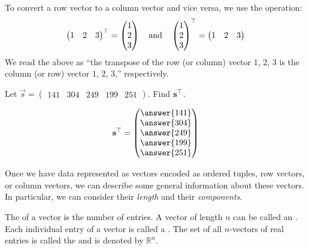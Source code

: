 \documentclass{ximera}
\begin{document}
\begin{definition}
  To convert a row vector to a column vector and vice versa, we use
  the  operation:
  \[
  \begin{pmatrix} 1 &  2 & 3 \end{pmatrix}^\top =
  \begin{pmatrix} 1 \\ 2 \\ 3 \end{pmatrix}
  \quad\text{and}\quad
  \begin{pmatrix} 1 \\ 2 \\ 3 \end{pmatrix}^\top =
  \begin{pmatrix} 1 &  2 & 3 \end{pmatrix}
  \]
  We read the above as ``the transpose of the row (or column) vector $1$,
  $2$, $3$ is the column (or row) vector $1$, $2$, $3$,'' respectively.
\end{definition}


\begin{question}
  Let
  $\vec{s} = \begin{pmatrix}141 & 304 & 249 & 199 &
    251 \end{pmatrix}$. Find $\mathbf{s}^\top$.
  \begin{prompt}
  \[
  \vec{s}^\transpose  = \begin{pmatrix}\answer{141} \\ \answer{304} \\ \answer{249} \\ \answer{199} \\ \answer{251} \end{pmatrix}
  \]
  \end{prompt}
\end{question}

Once we have data represented as vectors encoded as ordered tuples,
row vectors, or column vectors, we can describe some general
information about these vectors. In particular, we can consider their
\textit{length} and their \textit{components}.

\begin{definition}
  The  of a vector is the number of entries.  A vector of
  length $n$ can be called an .
  Each individual entry of a vector is called a . The
  set of all $n$-vectors of real entries is called the  and is denoted by $\mathbb{R}^n$.
\end{definition}
\end{document}
